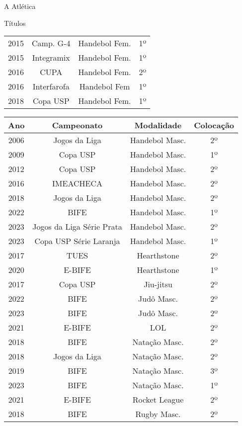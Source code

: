 \begin{secao}{A Atlética}
\begin{subsecao}{Títulos}
\begin{center}
\begin{tabular}{|c|c|c|c|}
    2015 & Camp. G-4      & Handebol Fem.   & 1º\\
    2015 & Integramix     & Handebol Fem.   & 1º\\
    2016 & CUPA           & Handebol Fem.   & 2º\\
    2016 & Interfarofa    & Handebol Fem    & 1º\\
    2018 & Copa USP       & Handebol Fem.   & 1º\\
    \hline
         \end{tabular}
\end{center}
\begin{center}
\begin{tabular}{|c|c|c|c|}
  \hline
  Ano & Campeonato & Modalidade & Colocação\\
  \hline
    2006 & Jogos da Liga  & Handebol Masc.  & 2º\\
    2009 & Copa USP       & Handebol Masc.  & 1º\\
    2012 & Copa USP       & Handebol Masc.  & 2º\\
    2016 & IMEACHECA      & Handebol Masc.  & 2º\\
    2018 & Jogos da Liga  & Handebol Masc.  & 2º\\
    2022 & BIFE           & Handebol Masc.  & 1º\\
    2023 & Jogos da Liga Série Prata & Handebol Masc. & 2º\\
    2023 & Copa USP Série Laranja & Handebol Masc.  & 1º\\
    2017 & TUES           & Hearthstone     & 2º\\
    2020 & E-BIFE         & Hearthstone     & 1º\\
    2017 & Copa USP       & Jiu-jitsu       & 2º\\
    2022 & BIFE           & Judô Masc.      & 2º\\
    2023 & BIFE           & Judô Masc.      & 2º\\
    2021 & E-BIFE         & LOL             & 2º\\
    2018 & BIFE           & Natação Masc.   & 2º\\
    2018 & Jogos da Liga  & Natação Masc.   & 2º\\
    2019 & BIFE           & Natação Masc.   & 3º\\
    2023 & BIFE           & Natação Masc.   & 1º\\
    2021 & E-BIFE         & Rocket League   & 2º\\
    2018 & BIFE           & Rugby Masc.     & 2º\\

\end{tabular}
\end{center}
\end{subsecao}
\end{secao}

